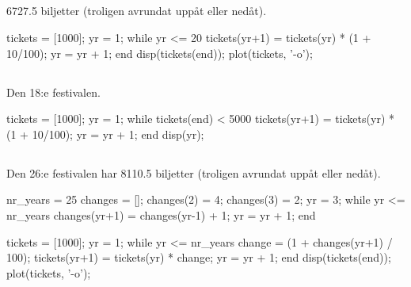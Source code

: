\subsection*{}
6727.5 biljetter (troligen avrundat uppåt eller nedåt).
\vspace{10pt}
\begin{matlab}
tickets = [1000]; %
yr = 1;
while yr <= 20
	tickets(yr+1) = tickets(yr) * (1 + 10/100);
	yr = yr + 1;
end
disp(tickets(end));
plot(tickets, '-o');
\end{matlab}

\subsection*{}
Den 18:e festivalen.
\vspace{10pt}
\begin{matlab}
tickets = [1000]; %
yr = 1;
while tickets(end) < 5000
	tickets(yr+1) = tickets(yr) * (1 + 10/100);
	yr = yr + 1;
end
disp(yr);
\end{matlab}

\newpage
\subsection*{}
Den 26:e festivalen har 8110.5 biljetter (troligen avrundat uppåt eller nedåt).
\vspace{10pt}
\begin{matlab}
nr_years = 25
changes = [];
changes(2) = 4;
changes(3) = 2;
yr = 3;
while yr <= nr_years
	changes(yr+1) = changes(yr-1) + 1;
	yr = yr + 1;
end

tickets = [1000]; %
yr = 1;
while yr <= nr_years
	change = (1 + changes(yr+1) / 100); 
	tickets(yr+1) = tickets(yr) * change;
	yr = yr + 1;
end
disp(tickets(end));
plot(tickets, '-o');
\end{matlab}



